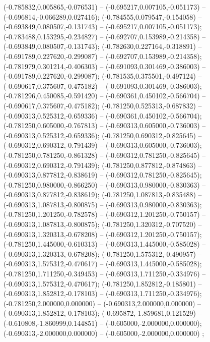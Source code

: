  (-0.785832,0.005865,-0.076531) -- (-0.695217,0.007105,-0.051173) -- (-0.696814,-0.066289,0.027416);
 (-0.784555,0.079547,-0.154058) -- (-0.693849,0.080507,-0.131743) -- (-0.695217,0.007105,-0.051173);
 (-0.783488,0.153295,-0.234827) -- (-0.692707,0.153989,-0.214358) -- (-0.693849,0.080507,-0.131743);
 (-0.782630,0.227164,-0.318891) -- (-0.691789,0.227620,-0.299087) -- (-0.692707,0.153989,-0.214358);
 (-0.781979,0.301214,-0.406303) -- (-0.691093,0.301469,-0.386003) -- (-0.691789,0.227620,-0.299087);
 (-0.781535,0.375501,-0.497124) -- (-0.690617,0.375607,-0.475182) -- (-0.691093,0.301469,-0.386003);
 (-0.781296,0.450085,-0.591420) -- (-0.690361,0.450102,-0.566704) -- (-0.690617,0.375607,-0.475182);
 (-0.781250,0.525313,-0.687832) -- (-0.690313,0.525312,-0.659336) -- (-0.690361,0.450102,-0.566704);
 (-0.781250,0.605000,-0.767813) -- (-0.690313,0.605000,-0.736003) -- (-0.690313,0.525312,-0.659336);
 (-0.781250,0.690312,-0.825645) -- (-0.690312,0.690312,-0.791439) -- (-0.690313,0.605000,-0.736003);
 (-0.781250,0.781250,-0.861328) -- (-0.690312,0.781250,-0.825645) -- (-0.690312,0.690312,-0.791439);
 (-0.781250,0.877812,-0.874863) -- (-0.690313,0.877812,-0.838619) -- (-0.690312,0.781250,-0.825645);
 (-0.781250,0.980000,-0.866250) -- (-0.690313,0.980000,-0.830363) -- (-0.690313,0.877812,-0.838619);
 (-0.781250,1.087813,-0.835488) -- (-0.690313,1.087813,-0.800875) -- (-0.690313,0.980000,-0.830363);
 (-0.781250,1.201250,-0.782578) -- (-0.690312,1.201250,-0.750157) -- (-0.690313,1.087813,-0.800875);
 (-0.781250,1.320312,-0.707520) -- (-0.690313,1.320313,-0.678208) -- (-0.690312,1.201250,-0.750157);
 (-0.781250,1.445000,-0.610313) -- (-0.690313,1.445000,-0.585028) -- (-0.690313,1.320313,-0.678208);
 (-0.781250,1.575312,-0.490957) -- (-0.690313,1.575312,-0.470617) -- (-0.690313,1.445000,-0.585028);
 (-0.781250,1.711250,-0.349453) -- (-0.690313,1.711250,-0.334976) -- (-0.690313,1.575312,-0.470617);
 (-0.781250,1.852812,-0.185801) -- (-0.690313,1.852812,-0.178103) -- (-0.690313,1.711250,-0.334976);
 (-0.781250,2.000000,0.000000) -- (-0.690313,2.000000,0.000000) -- (-0.690313,1.852812,-0.178103);
 (-0.695872,-1.859681,0.121529) -- (-0.610808,-1.860999,0.144851) -- (-0.605000,-2.000000,0.000000);
 (-0.690313,-2.000000,0.000000) -- (-0.605000,-2.000000,0.000000) ;
